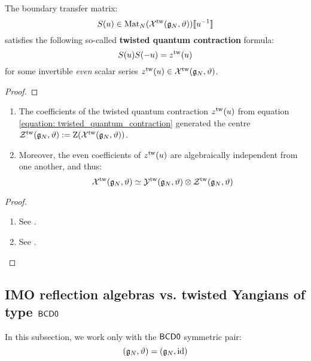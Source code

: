             \begin{lemma} \label{lemma: twsited_quantum_contractions}
                The boundary transfer matrix:
                    $$S(u) \in \mathrm{Mat}_N( \mathcal{X}^{\mathrm{tw}}(\mathfrak{g}_N, \vartheta) )[\![u^{-1}]\!]$$
                satisfies the following so-called \textbf{twisted quantum contraction} formula:
                    \begin{equation} \label{equation: twisted_quantum_contraction}
                        S(u) S(-u) = z^{\mathrm{tw}}(u)
                    \end{equation}
                for some invertible \textit{even} scalar series $z^{\mathrm{tw}}(u) \in \mathcal{X}^{\mathrm{tw}}(\mathfrak{g}_N, \vartheta)$.
            \end{lemma}
                \begin{proof}
                    
                \end{proof}
            \begin{lemma} \label{lemma: centres_of_extended_twisted_yangians}
                \begin{enumerate}
                    \item The coefficients of the twisted quantum contraction $z^{\mathrm{tw}}(u)$ from equation \eqref{equation: twisted_quantum_contraction} generated the centre $\mathcal{Z}^{\mathrm{tw}}(\mathfrak{g}_N, \vartheta) := \mathrm{Z}( \mathcal{X}^{\mathrm{tw}}(\mathfrak{g}_N, \vartheta) )$.
                    \item Moreover, the even coefficients of $z^{\mathrm{tw}}(u)$ are algebraically independent from one another, and thus:
                        $$\calX^{\tw}(\g_N, \vartheta) \cong \calY^{\tw}(\g_N, \vartheta) \tensor \calZ^{\tw}(\g_N, \vartheta)$$
                \end{enumerate}
            \end{lemma}
                \begin{proof}
                    \begin{enumerate}
                        \item See \cite[Corollary 3.5]{guay_regelskis_twisted_yangians_for_symmetric_pairs_of_types_BCD}.
                        \item See \cite[Corollary 3.6]{guay_regelskis_twisted_yangians_for_symmetric_pairs_of_types_BCD}.
                    \end{enumerate}
                \end{proof}

        \subsection{IMO reflection algebras vs. twisted Yangians of type \texorpdfstring{$\mathsf{B}\mathsf{C}\mathsf{D}\mathsf{0}$}{}}
            In this subsection, we work only with the $\mathsf{B}\mathsf{C}\mathsf{D}\mathsf{0}$ symmetric pair:
                $$(\mathfrak{g}_N, \vartheta) = (\mathfrak{g}_N, \mathrm{id})$$
        
